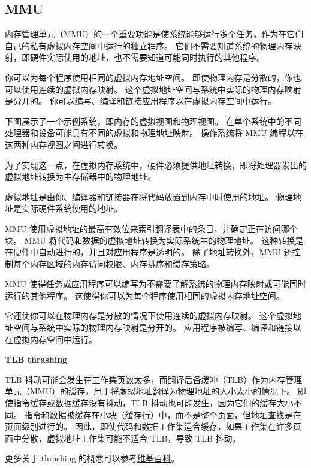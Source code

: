 \subsection{MMU}

内存管理单元（MMU）的一个重要功能是使系统能够运行多个任务，作为在它们自己的私有虚拟内存空间中运行的独立程序。
它们不需要知道系统的物理内存映射，即硬件实际使用的地址，也不需要知道可能同时执行的其他程序。


你可以为每个程序使用相同的虚拟内存地址空间。
即使物理内存是分散的，你也可以使用连续的虚拟内存映射。
这个虚拟地址空间与系统中实际的物理内存映射是分开的。
你可以编写、编译和链接应用程序以在虚拟内存空间中运行。

下图展示了一个示例系统，即内存的虚拟视图和物理视图。
在单个系统中的不同处理器和设备可能具有不同的虚拟和物理地址映射。
操作系统将 MMU 编程以在这两种内存视图之间进行转换。


为了实现这一点，在虚拟内存系统中，硬件必须提供地址转换，即将处理器发出的虚拟地址转换为主存储器中的物理地址。

虚拟地址是由你、编译器和链接器在将代码放置到内存中时使用的地址。
物理地址是实际硬件系统使用的地址。

MMU 使用虚拟地址的最高有效位来索引翻译表中的条目，并确定正在访问哪个块。
MMU 将代码和数据的虚拟地址转换为实际系统中的物理地址。
这种转换是在硬件中自动进行的，并且对应用程序是透明的。
除了地址转换外，MMU 还控制每个内存区域的内存访问权限、内存排序和缓存策略。


MMU 使得任务或应用程序可以编写为不需要了解系统的物理内存映射或可能同时运行的其他程序。
这使得你可以为每个程序使用相同的虚拟内存地址空间。

它还使你可以在物理内存是分散的情况下使用连续的虚拟内存映射。
这个虚拟地址空间与系统中实际的物理内存映射是分开的。
应用程序被编写、编译和链接以在虚拟内存空间中运行。




\begin{Tcbox}[title={扩展}]
\textbf{TLB thrashing}

  TLB 抖动可能会发生在工作集页数太多，而翻译后备缓冲（TLB）作为内存管理单元（MMU）的缓存，用于将虚拟地址翻译为物理地址的大小太小的情况下。
  即使指令缓存或数据缓存没有抖动，TLB 抖动也可能发生，因为它们的缓存大小不同。
  指令和数据被缓存在小块（缓存行）中，而不是整个页面，但地址查找是在页面级别进行的。
  因此，即使代码和数据工作集适合缓存，如果工作集在许多页面中分散，虚拟地址工作集可能不适合 TLB，导致 TLB 抖动。

  更多关于 thrashing 的概念可以参考\href{https://en.wikipedia.org/wiki/Thrashing_(computer_science)}{维基百科}。
\end{Tcbox}

